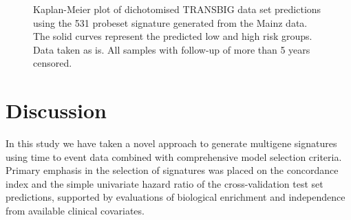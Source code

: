 \documentclass[letterpaper,12pt]{article}
\begin{document}
\begin{figure}[!th]

\centering
{}
\caption{Kaplan-Meier plot of dichotomised TRANSBIG data set predictions using the 531 probeset signature generated from the Mainz data. The solid curves represent the predicted low and high risk groups.  Data taken as is.  All samples with follow-up of more than 5 years censored.}
\label{Fig:PLSCoxKaplanMeierDesmedtVarCensoring}
\end{figure}


\section{Discussion}
In this study we have taken a novel approach to generate multigene signatures using time to event data combined with comprehensive model selection criteria. Primary emphasis in the selection of signatures was placed on the concordance index and the simple univariate hazard ratio of the cross-validation test set predictions, supported by evaluations of biological enrichment and independence from available clinical covariates. 
\end{document}

